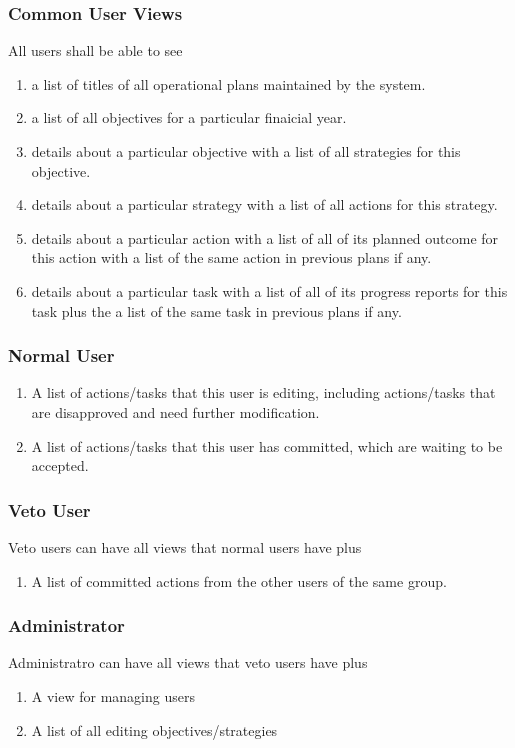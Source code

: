 \documentclass[a4, 11pt]{article}
\begin{document}
\subsubsection{Common User Views}
All users shall be able to see
\begin{enumerate}
	\item a list of titles of all operational plans maintained by the system.
	\item a list of all objectives for a particular finaicial year.
	\item details about a particular objective with a list of all strategies for this objective.
	\item details about a particular strategy with a list of all actions for this strategy.
	\item details about a particular action with a list of all of its planned outcome for this action with a list of the same action in previous plans if any.
	\item details about a particular task with a list of all of its progress reports for this task plus the a list of the same task in previous plans if any.
\end{enumerate}

\subsubsection{Normal User}
\begin{enumerate}
	\item A list of actions/tasks that this user is editing, including actions/tasks that are disapproved and need further modification. 
	\item A list of actions/tasks that this user has committed, which are waiting to be accepted.
\end{enumerate}

\subsubsection{Veto User}
Veto users can have all views that normal users have plus
\begin{enumerate}
	\item A list of committed actions from the other users of the same group.
\end{enumerate}

\subsubsection{Administrator}
Administratro can have all views that veto users have plus
\begin{enumerate}
	\item A view for managing users
	\item A list of all editing objectives/strategies
\end{enumerate}
\end{document}

